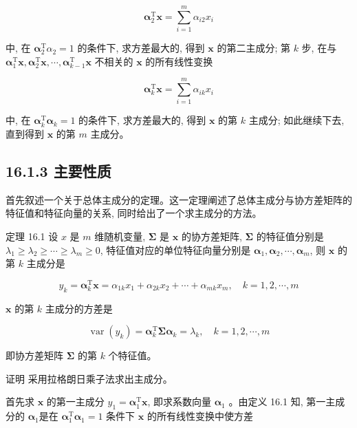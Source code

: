 \documentclass[10pt]{article}
\begin{document}
$$
\boldsymbol{\alpha}_{2}^{\mathrm{T}} \boldsymbol{x}=\sum_{i=1}^{m} \alpha_{i 2} x_{i}
$$

中, 在 $\boldsymbol{\alpha}_{2}^{\mathrm{T}} \alpha_{2}=1$ 的条件下, 求方差最大的, 得到 $\boldsymbol{x}$ 的第二主成分; 第 $k$ 步, 在与 $\boldsymbol{\alpha}_{1}^{\mathrm{T}} \boldsymbol{x}, \boldsymbol{\alpha}_{2}^{\mathrm{T}} \boldsymbol{x}, \cdots, \boldsymbol{\alpha}_{k-1}^{\mathrm{T}} \boldsymbol{x}$ 不相关的 $\boldsymbol{x}$ 的所有线性变换

$$
\boldsymbol{\alpha}_{k}^{\mathrm{T}} \boldsymbol{x}=\sum_{i=1}^{m} \alpha_{i k} x_{i}
$$

中, 在 $\boldsymbol{\alpha}_{k}^{\mathrm{T}} \boldsymbol{\alpha}_{k}=1$ 的条件下, 求方差最大的, 得到 $\boldsymbol{x}$ 的第 $k$ 主成分; 如此继续下去, 直到得到 $\boldsymbol{x}$ 的第 $m$ 主成分。

\subsection*{16.1.3 主要性质}
首先叙述一个关于总体主成分的定理。这一定理阐述了总体主成分与协方差矩阵的特征值和特征向量的关系, 同时给出了一个求主成分的方法。

定理 16.1 设 $x$ 是 $m$ 维随机变量, $\boldsymbol{\Sigma}$ 是 $\boldsymbol{x}$ 的协方差矩阵, $\boldsymbol{\Sigma}$ 的特征值分别是 $\lambda_{1} \geqslant \lambda_{2} \geqslant \cdots \geqslant \lambda_{m} \geqslant 0$, 特征值对应的单位特征向量分别是 $\boldsymbol{\alpha}_{1}, \boldsymbol{\alpha}_{2}, \cdots, \boldsymbol{\alpha}_{m}$, 则 $\boldsymbol{x}$ 的第 $k$ 主成分是


\begin{equation*}
y_{k}=\boldsymbol{\alpha}_{k}^{\mathrm{T}} \boldsymbol{x}=\alpha_{1 k} x_{1}+\alpha_{2 k} x_{2}+\cdots+\alpha_{m k} x_{m}, \quad k=1,2, \cdots, m \tag{16.5}
\end{equation*}


$\boldsymbol{x}$ 的第 $k$ 主成分的方差是


\begin{equation*}
\operatorname{var}\left(y_{k}\right)=\boldsymbol{\alpha}_{k}^{\mathrm{T}} \boldsymbol{\Sigma} \boldsymbol{\alpha}_{k}=\lambda_{k}, \quad k=1,2, \cdots, m \tag{16.6}
\end{equation*}


即协方差矩阵 $\boldsymbol{\Sigma}$ 的第 $k$ 个特征值。

证明 采用拉格朗日乘子法求出主成分。

首先求 $\boldsymbol{x}$ 的第一主成分 $y_{1}=\boldsymbol{\alpha}_{1}^{\mathrm{T}} \boldsymbol{x}$, 即求系数向量 $\boldsymbol{\alpha}_{1}$ 。由定义 16.1 知, 第一主成分的 $\boldsymbol{\alpha}_{1}$是在 $\boldsymbol{\alpha}_{1}^{\mathrm{T}} \boldsymbol{\alpha}_{1}=1$ 条件下 $\boldsymbol{x}$ 的所有线性变换中使方差
\end{document}
